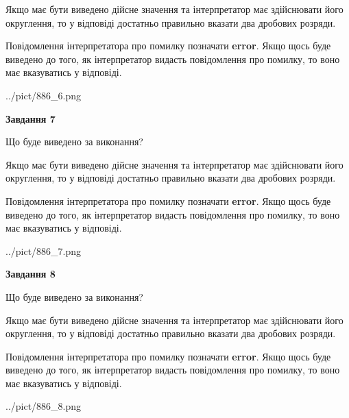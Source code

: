 \documentclass[12pt, ukrainian]{article}
\begin{document}
{\begin {Large}
Якщо має бути виведено дійсне значення та інтерпретатор має здійснювати його округлення, 
то у відповіді достатньо правильно вказати два дробових розряди.

Повідомлення інтерпретатора про помилку позначати \textbf{error}.
Якщо щось буде виведено до того, як інтерпретатор видасть повідомлення про помилку, 
то воно має вказуватись у відповіді. \par

\begin{center}
	{../pict/886_6.png}
\end{center}
\newpage

{\begin {center}\textbf{Завдання 7}\end {center}}\par
Що буде виведено за виконання? \par

Якщо має бути виведено дійсне значення та інтерпретатор має здійснювати його округлення, 
то у відповіді достатньо правильно вказати два дробових розряди.

Повідомлення інтерпретатора про помилку позначати \textbf{error}.
Якщо щось буде виведено до того, як інтерпретатор видасть повідомлення про помилку, 
то воно має вказуватись у відповіді. \par

\begin{center}
	{../pict/886_7.png}
\end{center}
\newpage

{\begin {center}\textbf{Завдання 8}\end {center}}\par
Що буде виведено за виконання? \par

Якщо має бути виведено дійсне значення та інтерпретатор має здійснювати його округлення, 
то у відповіді достатньо правильно вказати два дробових розряди.

Повідомлення інтерпретатора про помилку позначати \textbf{error}.
Якщо щось буде виведено до того, як інтерпретатор видасть повідомлення про помилку, 
то воно має вказуватись у відповіді. \par

\begin{center}
	{../pict/886_8.png}
\end{center}
\newpage


\end{Large}}
\end{document}
